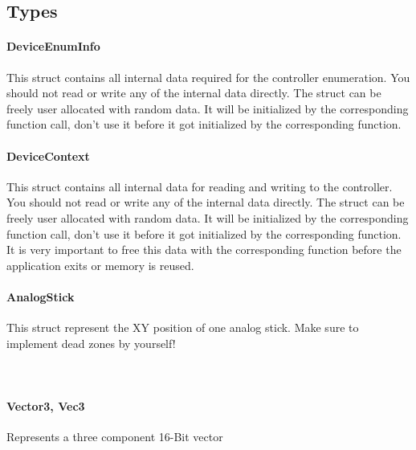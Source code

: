 \subsection{Types}
\paragraph{DeviceEnumInfo} This struct contains all internal data required for the controller enumeration. You should not read or write any of the internal data directly. The struct can be freely user allocated with random data. It will be initialized by the corresponding function call, don't use it before it got initialized by the corresponding function.

\paragraph{DeviceContext} This struct contains all internal data for reading and writing to the controller. You should not read or write any of the internal data directly. The struct can be freely user allocated with random data. It will be initialized by the corresponding function call, don't use it before it got initialized by the corresponding function. It is very important to free this data with the corresponding function before the application exits or memory is reused. 

\label{APIRef_Types_analstick}
\paragraph{AnalogStick} This struct represent the XY position of one analog stick. Make sure to implement dead zones by yourself! \\

 \\

 \\

\label{APIRef_Types_vec3}
\paragraph{Vector3, Vec3} Represents a three component 16-Bit vector \\

 \\

 \\

